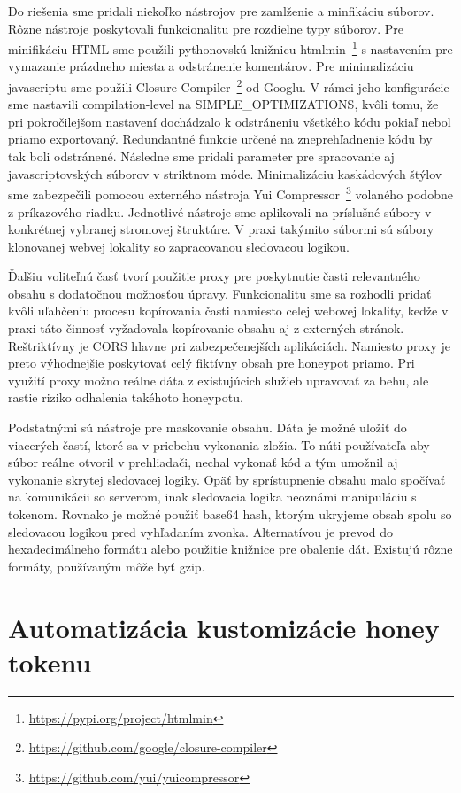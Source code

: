 \documentclass[conference, 11pt,slovak,a4paper,twoside]{IEEEtran}
\begin{document}
Do riešenia sme pridali niekoľko nástrojov pre zamlženie a minfikáciu súborov. Rôzne nástroje poskytovali funkcionalitu pre rozdielne typy súborov. Pre minifikáciu HTML sme použili pythonovskú knižnicu htmlmin~\footnote{\url{https://pypi.org/project/htmlmin}} s nastavením pre vymazanie prázdneho miesta a odstránenie komentárov. Pre minimalizáciu javascriptu sme použili Closure Compiler~\footnote{\url{https://github.com/google/closure-compiler}} od Googlu. V rámci jeho konfigurácie sme nastavili compilation-level na SIMPLE\_OPTIMIZATIONS, kvôli tomu, že pri pokročilejšom nastavení dochádzalo k odstráneniu všetkého kódu pokiaľ nebol priamo exportovaný. Redundantné funkcie určené na zneprehľadnenie kódu by tak boli odstránené. Následne sme pridali parameter pre spracovanie aj javascriptovských súborov v striktnom móde. Minimalizáciu kaskádových štýlov sme zabezpečili pomocou externého nástroja Yui Compressor~\footnote{\url{https://github.com/yui/yuicompressor}} volaného podobne z príkazového riadku. Jednotlivé nástroje sme aplikovali na príslušné súbory v konkrétnej vybranej stromovej štruktúre. V praxi takýmito súbormi sú súbory klonovanej webvej lokality so zapracovanou sledovacou logikou.

Ďalšiu voliteľnú časť tvorí použitie proxy pre poskytnutie časti relevantného obsahu s dodatočnou možnosťou úpravy. Funkcionalitu sme sa rozhodli pridať kvôli uľahčeniu procesu kopírovania časti namiesto celej webovej lokality, keďže v praxi táto činnosť vyžadovala kopírovanie obsahu aj z externých stránok. Reštriktívny je CORS hlavne pri zabezpečenejších aplikáciách. Namiesto proxy je preto výhodnejšie poskytovať celý fiktívny obsah pre honeypot priamo. Pri využití proxy možno reálne dáta z existujúcich služieb upravovať za behu, ale rastie riziko odhalenia takéhoto honeypotu.

Podstatnými sú nástroje pre maskovanie obsahu. Dáta je možné uložiť do viacerých častí, ktoré sa v priebehu vykonania zložia. To núti používateľa aby súbor reálne otvoril v prehliadači, nechal vykonať kód a tým umožnil aj vykonanie skrytej sledovacej logiky. Opäť by sprístupnenie obsahu malo spočívať na komunikácii so serverom, inak sledovacia logika neoznámi manipuláciu s tokenom. Rovnako je možné použiť base64 hash, ktorým ukryjeme obsah spolu so sledovacou logikou pred vyhľadaním zvonka. Alternatívou je prevod do hexadecimálneho formátu alebo použitie knižnice pre obalenie dát. Existujú rôzne formáty, používaným môže byť gzip. 


\section{Automatizácia kustomizácie honey tokenu}
\end{document}
